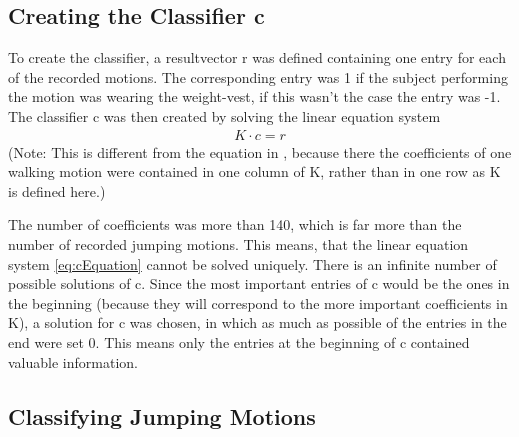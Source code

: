 \documentclass[a4paper]{article}
\begin{document}
\subsection{Creating the Classifier c}

To create the classifier, a resultvector r was defined containing one entry for each of the recorded motions. The corresponding entry was 1 if the subject performing the motion was wearing the weight-vest, if this wasn't the case the entry was -1. The classifier c was then created by solving the linear equation system
\begin{align}
	K \cdot c=r \label{eq:cEquation}
\end{align} 
(Note: This is different from the equation in \cite{origin}, because there the coefficients of one walking motion were contained in one column of K, rather than in one row as K is defined here.)

The number of coefficients was more than 140, which is far more than the number of recorded jumping motions. This means, that the linear equation system \ref{eq:cEquation} cannot be solved uniquely. There is an infinite number of possible solutions of c. Since the most important entries of c would be the ones in the beginning (because they will correspond to the more important coefficients in K), a solution for c was chosen, in which as much as possible of the entries in the end were set 0. This means only the entries at the beginning of c contained valuable information.

\subsection{Classifying Jumping Motions}
\end{document}
